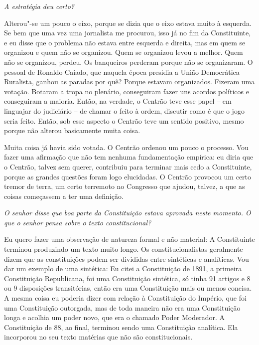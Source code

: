 \medskip

\noindent\emph{A estratégia deu certo?}

Alterou"-se um pouco o eixo, porque se dizia que o eixo
estava muito à esquerda. Se bem que uma vez uma jornalista me procurou,
isso já no fim da Constituinte, e eu disse que o problema não estava
entre esquerda e direita, mas em quem se organizou e quem não se
organizou. Quem se organizou levou a melhor. Quem não se organizou,
perdeu. Os banqueiros perderam porque não se organizaram. O pessoal de
Ronaldo Caiado, que naquela época presidia a União Democrática
Ruralista, ganhou as paradas por quê? Porque estavam organizados.
Fizeram uma votação. Botaram a tropa no plenário, conseguiram fazer uns
acordos políticos e conseguiram a maioria. Então, na verdade, o Centrão
teve esse papel -- em linguajar do judiciário -- de chamar o feito à
ordem, discutir como é que o jogo seria feito. Então, sob esse aspecto o
Centrão teve um sentido positivo, mesmo porque não alterou basicamente
muita coisa.

Muita coisa já havia sido votada. O Centrão ordenou um pouco o processo.
Vou fazer uma afirmação que não tem nenhuma fundamentação empírica: eu
diria que o Centrão, talvez sem querer, contribuiu para terminar mais
cedo a Constituinte, porque as grandes questões foram logo elucidadas. O
Centrão provocou um certo tremor de terra, um certo terremoto no
Congresso que ajudou, talvez, a que as coisas começassem a ter uma
definição.

\medskip

\noindent\emph{O senhor disse que boa parte da Constituição estava aprovada
neste momento. O que o senhor pensa sobre o texto constitucional?}

Eu quero fazer uma observação de natureza formal e não
material: A Constituinte terminou produzindo um texto muito longo. Os
constitucionalistas geralmente dizem que as constituições podem ser
divididas entre sintéticas e analíticas. Vou dar um exemplo de uma
sintética: Eu citei a Constituição de 1891, a primeira Constituição
Republicana, foi uma Constituição sintética, só tinha 91 artigos e 8 ou
9 disposições transitórias, então era uma Constituição mais ou menos
concisa. A mesma coisa eu poderia dizer com relação à Constituição do
Império, que foi uma Constituição outorgada, mas de toda maneira não era
uma Constituição longa e acolhia um poder novo, que era o chamado Poder
Moderador. A Constituição de 88, ao final, terminou sendo uma
Constituição analítica. Ela incorporou no seu texto matérias que não são
constitucionais.

